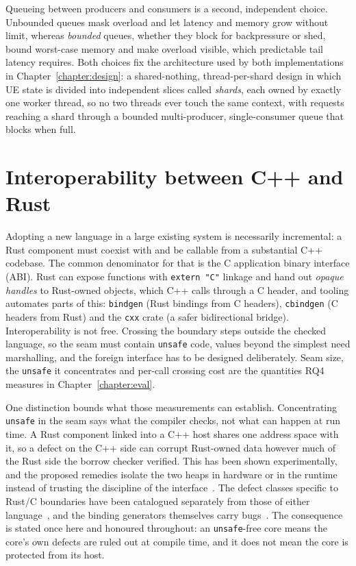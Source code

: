 Queueing between producers and consumers is a second, independent choice. Unbounded queues mask
overload and let latency and memory grow without limit, whereas \emph{bounded} queues, whether
they block for backpressure or shed, bound worst-case memory and make overload visible, which
predictable tail latency requires. Both choices fix the architecture used by both implementations
in Chapter~\ref{chapter:design}: a shared-nothing, thread-per-shard design in which UE state is
divided into independent slices called \emph{shards}, each owned by exactly one worker thread, so
no two threads ever touch the same context, with requests reaching a shard through a bounded
multi-producer, single-consumer queue that blocks when full.

\section{Interoperability between C++ and Rust}\label{sec:interop}
Adopting a new language in a large existing system is necessarily incremental: a Rust component
must coexist with and be callable from a substantial C++ codebase. The common denominator for
that is the C application binary interface (ABI). Rust can expose functions with
\texttt{extern "C"} linkage and hand out \emph{opaque handles} to Rust-owned objects, which C++
calls through a C header, and tooling automates parts of this: \texttt{bindgen} (Rust bindings
from C headers), \texttt{cbindgen} (C headers from Rust) and the \texttt{cxx} crate (a safer
bidirectional bridge). Interoperability is not free. Crossing the boundary steps outside the
checked language, so the seam must contain \texttt{unsafe} code, values beyond the simplest need
marshalling, and the foreign interface has to be designed deliberately. Seam size, the
\texttt{unsafe} it concentrates and per-call crossing cost are the quantities RQ4 measures in
Chapter~\ref{chapter:eval}.

One distinction bounds what those measurements can establish. Concentrating \texttt{unsafe} in
the seam says what the compiler checks, not what can happen at run time. A Rust component linked
into a C++ host shares one address space with it, so a defect on the C++ side can corrupt
Rust-owned data however much of the Rust side the borrow checker verified. This has been shown
experimentally, and the proposed remedies isolate the two heaps in hardware or in the runtime
instead of trusting the discipline of the interface~\cite{rivera2021galeed,kirth2022pkrusafe}. The
defect classes specific to Rust/C boundaries have been catalogued separately from those of either
language~\cite{li2022crosslang}, and the binding generators themselves carry
bugs~\cite{cai2026interop}. The consequence is stated once here and honoured throughout: an
\texttt{unsafe}-free core means the core's own defects are ruled out at compile time, and it does
not mean the core is protected from its host.

